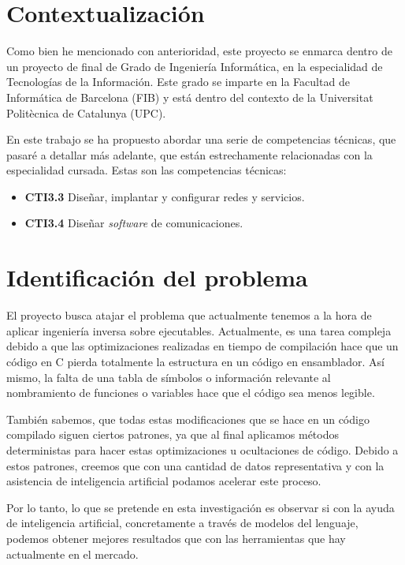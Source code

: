 \section{Contextualización}
\label{sec:contextualizacion}


Como bien he mencionado con anterioridad, este proyecto se enmarca dentro de un proyecto de final de Grado de Ingeniería Informática, en la especialidad de Tecnologías de la Información.
Este grado se imparte en la Facultad de Informática de Barcelona (FIB) y está dentro del contexto de la Universitat Politècnica de Catalunya (UPC).

En este trabajo se ha propuesto abordar una serie de competencias técnicas, que pasaré a detallar más adelante, que están estrechamente relacionadas con la especialidad cursada. Estas
son las competencias técnicas:

\begin{itemize}
    \item \textbf{CTI3.3} Diseñar, implantar y configurar redes y servicios.
    \item \textbf{CTI3.4} Diseñar \textit{software} de comunicaciones.
\end{itemize}

\section{Identificación del problema}
\label{sec:problema}


El proyecto busca atajar el problema que actualmente tenemos a la hora de aplicar ingeniería inversa sobre ejecutables. Actualmente, es una tarea compleja debido a que las optimizaciones
realizadas en tiempo de compilación hace que un código en C pierda totalmente la estructura en un código en ensamblador. Así mismo, la falta de una tabla de símbolos o información relevante
al nombramiento de funciones o variables hace que el código sea menos legible.

También sabemos, que todas estas modificaciones que se hace en un código compilado siguen ciertos patrones, ya que al final aplicamos métodos deterministas para hacer estas optimizaciones
u ocultaciones de código. Debido a estos patrones, creemos que con una cantidad de datos representativa y con la asistencia de inteligencia artificial podamos acelerar este proceso.

Por lo tanto, lo que se pretende en esta investigación es observar si con la ayuda de inteligencia artificial, concretamente a través de modelos del lenguaje, podemos obtener mejores
resultados que con las herramientas que hay actualmente en el mercado.

